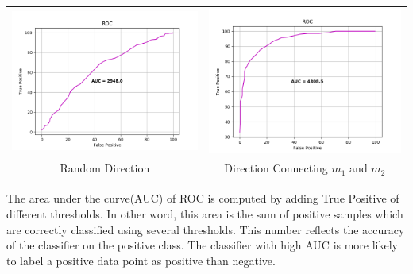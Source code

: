 \documentclass{article}
\begin{document}
\begin{center}
\begin{tabular}{cc}
\includegraphics[scale=0.25]{roc_random_dir} &
\includegraphics[scale=0.25]{roc_mean} \\
\scriptsize Random Direction &
\scriptsize Direction Connecting \textit{${m_1}$} and \textit{${m_2}$}
\end{tabular}
\end{center}

\indent The area under the curve(AUC) of ROC is computed by adding True Positive of different thresholds. In other word, this area is the sum of positive samples which are correctly classified using several thresholds. This number reflects the accuracy of the classifier on the positive class. The classifier with high AUC is more likely to label a positive data point as positive than negative.  
\end{document}
